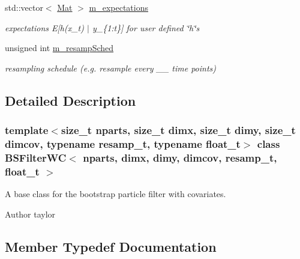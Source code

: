 \begin{DoxyCompactItemize}
\mbox{\label{classBSFilterWC_ab3c3b0f329bd3ce8980242551fb8bd37}} 
std\+::vector$<$ \hyperlink{classBSFilterWC_a507a06203a27e3a025a43be68b4b0e0e}{Mat} $>$ \hyperlink{classBSFilterWC_ab3c3b0f329bd3ce8980242551fb8bd37}{m\+\_\+expectations}
\begin{DoxyCompactList}\small\item\em expectations E\mbox{[}h(x\+\_\+t) $\vert$ y\+\_\+\{1\+:t\}\mbox{]} for user defined \char`\"{}h\char`\"{}s \end{DoxyCompactList}\item 
\mbox{\label{classBSFilterWC_a8d173dfb2640a96e97488a5cbba4444d}} 
unsigned int \hyperlink{classBSFilterWC_a8d173dfb2640a96e97488a5cbba4444d}{m\+\_\+resamp\+Sched}
\begin{DoxyCompactList}\small\item\em resampling schedule (e.\+g. resample every \+\_\+\+\_\+ time points) \end{DoxyCompactList}\end{DoxyCompactItemize}


\subsection{Detailed Description}
\subsubsection*{template$<$size\+\_\+t nparts, size\+\_\+t dimx, size\+\_\+t dimy, size\+\_\+t dimcov, typename resamp\+\_\+t, typename float\+\_\+t$>$\newline
class B\+S\+Filter\+W\+C$<$ nparts, dimx, dimy, dimcov, resamp\+\_\+t, float\+\_\+t $>$}

A base class for the bootstrap particle filter with covariates. 

\begin{DoxyAuthor}{Author}
taylor 
\end{DoxyAuthor}


\subsection{Member Typedef Documentation}
\mbox{\label{classBSFilterWC_a12c3f32cb628a0efaa0267262205d6d6}} 
